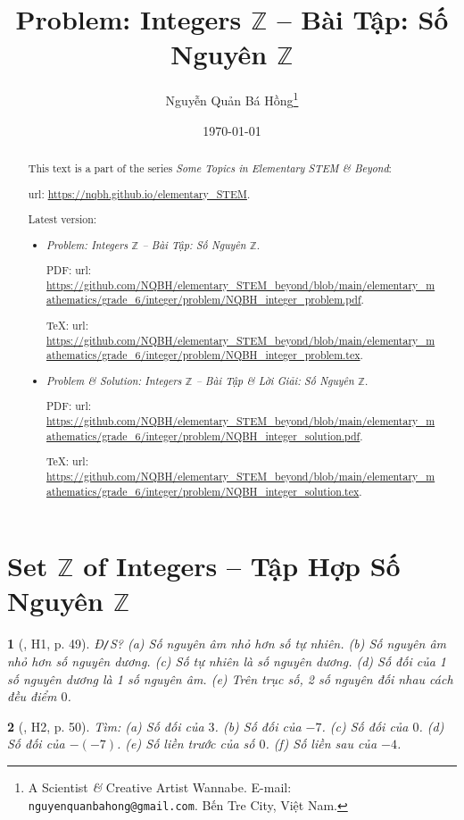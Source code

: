 \documentclass{article}
\title{Problem: Integers $\mathbb{Z}$ -- Bài Tập: Số Nguyên $\mathbb{Z}$}
\author{Nguyễn Quản Bá Hồng\footnote{A Scientist {\it\&} Creative Artist Wannabe. E-mail: {\tt nguyenquanbahong@gmail.com}. Bến Tre City, Việt Nam.}}
\date{\today}
\newtheorem{baitoan}{}
\begin{document}
\maketitle
\begin{abstract}
	This text is a part of the series {\it Some Topics in Elementary STEM \& Beyond}:
	
	{\sc url}: \url{https://nqbh.github.io/elementary_STEM}.
	
	Latest version:
	\begin{itemize}
		\item {\it Problem: Integers $\mathbb{Z}$ -- Bài Tập: Số Nguyên $\mathbb{Z}$}.
		
		PDF: {\sc url}: \url{https://github.com/NQBH/elementary_STEM_beyond/blob/main/elementary_mathematics/grade_6/integer/problem/NQBH_integer_problem.pdf}.
		
		\TeX: {\sc url}: \url{https://github.com/NQBH/elementary_STEM_beyond/blob/main/elementary_mathematics/grade_6/integer/problem/NQBH_integer_problem.tex}.
		\item {\it Problem \& Solution: Integers $\mathbb{Z}$ -- Bài Tập \& Lời Giải: Số Nguyên $\mathbb{Z}$}.
		
		PDF: {\sc url}: \url{https://github.com/NQBH/elementary_STEM_beyond/blob/main/elementary_mathematics/grade_6/integer/problem/NQBH_integer_solution.pdf}.
		
		\TeX: {\sc url}: \url{https://github.com/NQBH/elementary_STEM_beyond/blob/main/elementary_mathematics/grade_6/integer/problem/NQBH_integer_solution.tex}.
	\end{itemize}
\end{abstract}
\tableofcontents


\section{Set $\mathbb{Z}$ of Integers -- Tập Hợp Số Nguyên $\mathbb{Z}$}

\begin{baitoan}[\cite{Binh_boi_duong_Toan_6_tap_1}, H1, p. 49]
	{\rm Đ{\tt/}S?} (a) Số nguyên âm nhỏ hơn số tự nhiên. (b) Số nguyên âm nhỏ hơn số nguyên dương. (c) Số tự nhiên là số nguyên dương. (d) Số đối của 1 số nguyên dương là 1 số nguyên âm. (e) Trên trục số, 2 số nguyên đối nhau cách đều điểm $0$.
\end{baitoan}

\begin{baitoan}[\cite{Binh_boi_duong_Toan_6_tap_1}, H2, p. 50]
	Tìm: (a) Số đối của $3$. (b) Số đối của $-7$. (c) Số đối của $0$. (d) Số đối của $-(-7)$. (e) Số liền trước của số $0$. (f) Số liền sau của $-4$.
\end{baitoan}
\end{document}

